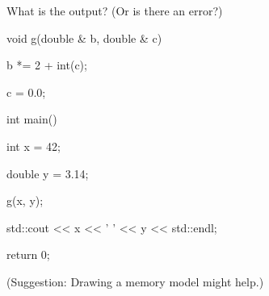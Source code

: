 What is the output? (Or is there an error?)



\begin{consolethree}[escapeinside=||]

void g(double & b, double & c)

{

    b *= 2 + int(c);

    c = 0.0;

}



int main()

{

    int x = 42;

    double y = 3.14;

    g(x, y);

    std::cout << x << ' ' << y << std::endl;

    return 0;

}

\end{consolethree}



(Suggestion: Drawing a memory model might help.)

